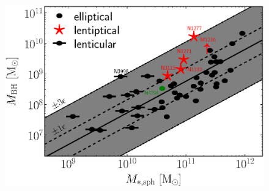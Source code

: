\documentclass[12pt,preprint]{nature}
\begin{document}
\begin{figure}
\includegraphics[width=\columnwidth]{images/mm.eps}
\caption{
}
\label{fig:mm}
\end{figure}
\end{document}
